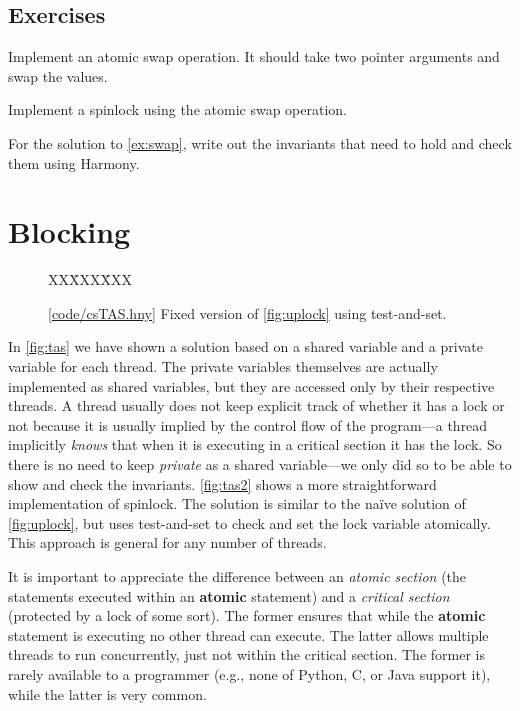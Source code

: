 \documentclass{report}
\newcommand{\harmonysource}[1]{
\begin{tabbing}
XX\=XXX\=XXX\kill
    
\end{tabbing}
}
\newcommand{\harmonylink}[1]{%
[\href{https://harmony.cs.cornell.edu/#1}{\underline{#1}}]%
}
\newenvironment{code}{
\tcolorbox
}{
\endtcolorbox
}
\begin{document}
\section*{Exercises}
\begin{problems}
\item Implement an atomic swap operation.  It should take two pointer arguments
and swap the values.
\item \label{ex:swap} Implement a spinlock using the atomic swap operation.
\item For the solution to \autoref{ex:swap},
write out the invariants that need to hold and check them using Harmony.
\end{problems}

\chapter{Blocking}
\label{ch:synch}
%
%

\begin{figure}
\begin{code}
\harmonysource{csTAS}
\end{code}
\caption{\harmonylink{code/csTAS.hny} Fixed version of \autoref{fig:uplock} using test-and-set.}
\label{fig:tas2}
\end{figure}

In \autoref{fig:tas} we have shown a solution based on a shared
variable and a private variable for each thread.   The private
variables themselves are actually implemented as shared variables,
but they are accessed only by their respective threads.
A thread usually does not keep explicit track of whether it has a lock
or not because it is usually implied by the control flow of the program---a
thread implicitly \emph{knows} that when it is executing in a critical
section it has the lock.
So there is no need to keep \textit{private} as a shared
variable---we only did so to be able to show and check the invariants.
\autoref{fig:tas2} shows a more straightforward implementation of spinlock.
The solution is similar to the na\"{i}ve solution of \autoref{fig:uplock},
but uses test-and-set to check and set the lock variable atomically.
This approach is general for any number of threads.

It is important to appreciate the difference between an
\emph{atomic section} (the statements executed within an
\textbf{atomic} statement) and a \emph{critical section}
(protected by a lock of some sort).
The former ensures that while the
\textbf{atomic} statement is executing no other thread can execute.
The latter allows multiple threads to run concurrently,
just not within the critical section.
The former is rarely available to a programmer (e.g., none of
Python, C, or Java support it), while the latter
is very common.
\end{document}
